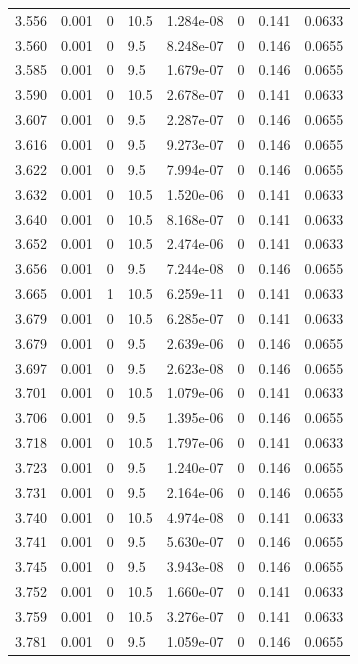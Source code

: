 \documentclass[preview]{standalone}
\begin{document}
{{{{{{{{{{{\begin{tabular}{L{1.2cm}C{1.2cm} C{0.3cm}C{0.5cm} C{1.4cm}C{1.4cm} C{1.4cm}C{1.4cm}}
  3.556  &  0.001  & 0     & 10.5 &  1.284e-08  & 0  & 0.141 &  0.0633   \\ 
  3.560  &  0.001  & 0     & 9.5 &  8.248e-07  & 0  & 0.146 &  0.0655   \\ 
  3.585  &  0.001  & 0     & 9.5 &  1.679e-07  & 0  & 0.146 &  0.0655   \\ 
  3.590  &  0.001  & 0     & 10.5 &  2.678e-07  & 0  & 0.141 &  0.0633   \\ 
  3.607  &  0.001  & 0     & 9.5 &  2.287e-07  & 0  & 0.146 &  0.0655   \\ 
  3.616  &  0.001  & 0     & 9.5 &  9.273e-07  & 0  & 0.146 &  0.0655   \\ 
  3.622  &  0.001  & 0     & 9.5 &  7.994e-07  & 0  & 0.146 &  0.0655   \\ 
  3.632  &  0.001  & 0     & 10.5 &  1.520e-06  & 0  & 0.141 &  0.0633   \\ 
  3.640  &  0.001  & 0     & 10.5 &  8.168e-07  & 0  & 0.141 &  0.0633   \\ 
  3.652  &  0.001  & 0     & 10.5 &  2.474e-06  & 0  & 0.141 &  0.0633   \\ 
  3.656  &  0.001  & 0     & 9.5 &  7.244e-08  & 0  & 0.146 &  0.0655   \\ 
  3.665  &  0.001  & 1     & 10.5 &  6.259e-11  & 0  & 0.141 &  0.0633   \\ 
  3.679  &  0.001  & 0     & 10.5 &  6.285e-07  & 0  & 0.141 &  0.0633   \\ 
  3.679  &  0.001  & 0     & 9.5 &  2.639e-06  & 0  & 0.146 &  0.0655   \\ 
  3.697  &  0.001  & 0     & 9.5 &  2.623e-08  & 0  & 0.146 &  0.0655   \\ 
  3.701  &  0.001  & 0     & 10.5 &  1.079e-06  & 0  & 0.141 &  0.0633   \\ 
  3.706  &  0.001  & 0     & 9.5 &  1.395e-06  & 0  & 0.146 &  0.0655   \\ 
  3.718  &  0.001  & 0     & 10.5 &  1.797e-06  & 0  & 0.141 &  0.0633   \\ 
  3.723  &  0.001  & 0     & 9.5 &  1.240e-07  & 0  & 0.146 &  0.0655   \\ 
  3.731  &  0.001  & 0     & 9.5 &  2.164e-06  & 0  & 0.146 &  0.0655   \\ 
  3.740  &  0.001  & 0     & 10.5 &  4.974e-08  & 0  & 0.141 &  0.0633   \\ 
  3.741  &  0.001  & 0     & 9.5 &  5.630e-07  & 0  & 0.146 &  0.0655   \\ 
  3.745  &  0.001  & 0     & 9.5 &  3.943e-08  & 0  & 0.146 &  0.0655   \\ 
  3.752  &  0.001  & 0     & 10.5 &  1.660e-07  & 0  & 0.141 &  0.0633   \\ 
  3.759  &  0.001  & 0     & 10.5 &  3.276e-07  & 0  & 0.141 &  0.0633   \\ 
  3.781  &  0.001  & 0     & 9.5 &  1.059e-07  & 0  & 0.146 &  0.0655   \\ 
\hline 
\end{tabular} 

}}}}}}}}}}}
\end{document}
